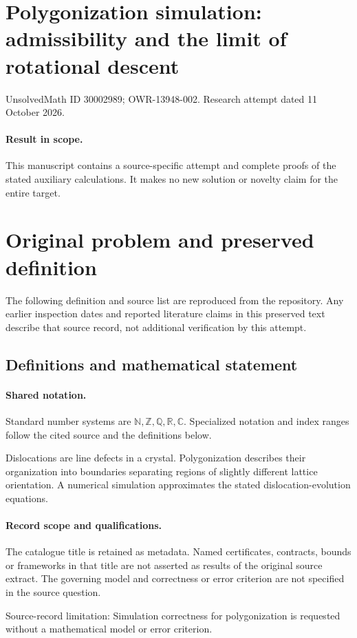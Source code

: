 \documentclass[11pt]{article}
\begin{document}
\section*{Polygonization simulation: admissibility and the limit of rotational descent}
\noindent UnsolvedMath ID 30002989; OWR-13948-002. Research attempt dated 11 October 2026.
\paragraph{Result in scope.}This manuscript contains a source-specific attempt and complete proofs of the stated auxiliary calculations. It makes no new solution or novelty claim for the entire target.
\section{Original problem and preserved definition}
The following definition and source list are reproduced from the repository. Any earlier inspection dates and reported literature claims in this preserved text describe that source record, not additional verification by this attempt.
\subsection{Definitions and mathematical statement}

\paragraph{Shared notation.}Standard number systems are $\mathbb N,\mathbb Z,\mathbb Q,\mathbb R,\mathbb C$. Specialized notation and index ranges follow the cited source and the definitions below.


Dislocations are line defects in a crystal. Polygonization describes their organization into boundaries separating regions of slightly different lattice orientation. A numerical simulation approximates the stated dislocation-evolution equations.
\paragraph{Record scope and qualifications.}
The catalogue title is retained as metadata. Named certificates, contracts, bounds or frameworks in that title are not asserted as results of the original source extract.
The governing model and correctness or error criterion are not specified in the source question.

Source-record limitation: Simulation correctness for polygonization is requested without a mathematical model or error criterion.
\end{document}
